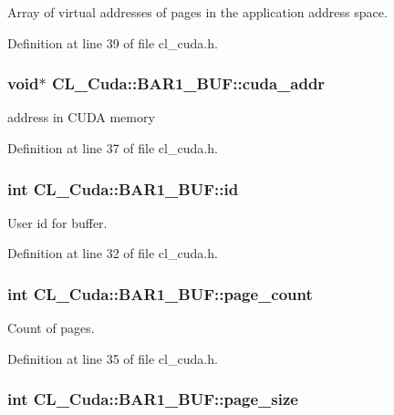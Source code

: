 Array of virtual addresses of pages in the application address space. 

Definition at line 39 of file cl\_\-cuda.h.\hypertarget{structCL__Cuda_1_1BAR1__BUF_abf1412171544f2f49dc08f7a9075b1bf}{
\subsubsection[{cuda\_\-addr}]{\setlength{\rightskip}{0pt plus 5cm}void$\ast$ {\bf CL\_\-Cuda::BAR1\_\-BUF::cuda\_\-addr}}}
\label{structCL__Cuda_1_1BAR1__BUF_abf1412171544f2f49dc08f7a9075b1bf}


address in CUDA memory 

Definition at line 37 of file cl\_\-cuda.h.\hypertarget{structCL__Cuda_1_1BAR1__BUF_a8af9f6eea7e56fddd4b787779e874adb}{
\subsubsection[{id}]{\setlength{\rightskip}{0pt plus 5cm}int {\bf CL\_\-Cuda::BAR1\_\-BUF::id}}}
\label{structCL__Cuda_1_1BAR1__BUF_a8af9f6eea7e56fddd4b787779e874adb}


User id for buffer. 

Definition at line 32 of file cl\_\-cuda.h.\hypertarget{structCL__Cuda_1_1BAR1__BUF_a6ea1b2d3c511faee8ddb0185b005b177}{
\subsubsection[{page\_\-count}]{\setlength{\rightskip}{0pt plus 5cm}int {\bf CL\_\-Cuda::BAR1\_\-BUF::page\_\-count}}}
\label{structCL__Cuda_1_1BAR1__BUF_a6ea1b2d3c511faee8ddb0185b005b177}


Count of pages. 

Definition at line 35 of file cl\_\-cuda.h.\hypertarget{structCL__Cuda_1_1BAR1__BUF_a3199bd167acc38097fbdbe0fef227b1a}{
\subsubsection[{page\_\-size}]{\setlength{\rightskip}{0pt plus 5cm}int {\bf CL\_\-Cuda::BAR1\_\-BUF::page\_\-size}}}
\label{structCL__Cuda_1_1BAR1__BUF_a3199bd167acc38097fbdbe0fef227b1a}


